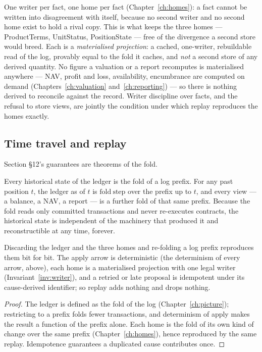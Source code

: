 One writer per fact, one home per fact (Chapter~\ref{ch:homes}): a fact cannot be
written into disagreement with itself, because no second writer and no second home
exist to hold a rival copy. This is what keeps the three homes ---
ProductTerms, UnitStatus, PositionState --- free of the divergence a second store
would breed. Each is a \emph{materialised projection}: a cached, one-writer,
rebuildable read of the log, provably equal to the fold it caches, and \emph{not}
a second store of any derived quantity. No figure a valuation or a report
recomputes is materialised anywhere --- NAV, profit and loss, availability,
encumbrance are computed on demand (Chapters~\ref{ch:valuation}
and~\ref{ch:reporting}) --- so there is nothing derived to reconcile against the
record. Writer discipline over facts, and the refusal to store views, are jointly
the condition under which replay reproduces the homes exactly.

\subsection{Time travel and replay}

Section \S 12's guarantees are theorems of the fold.

\begin{theorem}\label{thm:timetravel}
Every historical state of the ledger is the fold of a log prefix. For any past
position $t$, the ledger as of $t$ is $\mathrm{fold\ step}$ over the prefix up to
$t$, and every view --- a balance, a NAV, a report --- is a further fold of that
same prefix. Because the fold reads only committed transactions and never
re-executes contracts, the historical state is independent of the machinery that
produced it and reconstructible at any time, forever.
\end{theorem}

\begin{theorem}\label{thm:replay}
Discarding the ledger and the three homes and re-folding a log prefix reproduces
them bit for bit. The apply arrow is deterministic (the determinism of every
arrow, above), each home is a materialised projection with one legal writer
(Invariant~\ref{inv:writer}), and a retried or late proposal is
idempotent under its cause-derived identifier; so replay adds nothing and drops
nothing.
\end{theorem}

\begin{proof}
The ledger is defined as the fold of the log (Chapter~\ref{ch:picture});
restricting to a prefix folds fewer transactions, and determinism of apply makes
the result a function of the prefix alone. Each home is the fold of its own kind
of change over the same prefix (Chapter~\ref{ch:homes}), hence reproduced by the
same replay. Idempotence guarantees a duplicated cause contributes once.
\end{proof}

